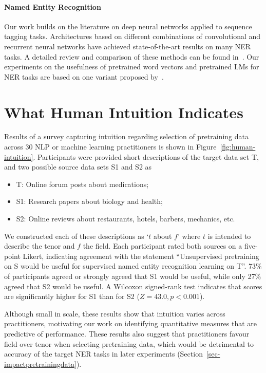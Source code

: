 \documentclass[11pt,a4paper]{article}
\begin{document}
\paragraph{Named Entity Recognition}
Our work builds on the literature on deep neural networks applied to sequence tagging tasks.
Architectures based on different combinations of convolutional and recurrent neural networks have achieved state-of-the-art results on many NER tasks. 
A detailed review and comparison of these methods can be found in~\citep{Yang:Liang:COLING:2018}. 
Our experiments on the usefulness of pretrained word vectors and pretrained LMs for NER tasks are based on one variant proposed by~\citet{Lample:Ballesteros:NAACL:2016}.

\section{What Human Intuition Indicates}
\label{section:survey}
Results of a survey capturing intuition regarding selection of pretraining data across 30 NLP or machine learning practitioners is shown in Figure~\ref{fig:human-intuition}. Participants were provided short descriptions of the target data set T, and two possible source data sets S1 and S2 as
\begin{itemize}
    \item T: Online forum posts about medications;
    \item S1: Research papers about biology and health; 
    \item S2: Online reviews about restaurants, hotels, barbers, mechanics, etc.
\end{itemize}

We constructed each of these descriptions as `$t$ about $f$' where $t$ is intended to describe the tenor and $f$ the field. Each participant rated both sources on a five-point Likert, indicating agreement with the statement ``Unsupervised pretraining on S would be useful for supervised named entity recognition learning on T''.  73\% of participants agreed or strongly agreed that S1 would be useful, while only 27\% agreed that S2 would be useful. A Wilcoxon signed-rank test indicates that scores are significantly higher for S1 than for S2 ($Z = 43.0, p < 0.001$). 

Although small in scale, these results show that intuition varies across practitioners, motivating our work on identifying quantitative measures that are predictive of performance. These results also suggest that practitioners favour field over tenor when selecting pretraining data, which would be detrimental to accuracy of the target NER tasks in later experiments (Section~\ref{sec-impactpretrainingdata}).
\end{document}
